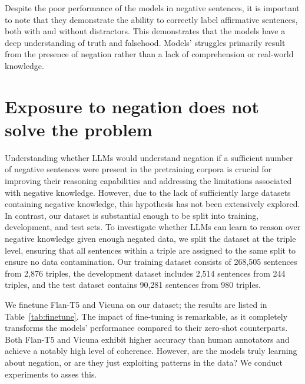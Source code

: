 \documentclass[11pt]{article}
\begin{document}
Despite the poor performance of the models in negative sentences, it is important to note that they demonstrate the ability to correctly label affirmative sentences, both with and without distractors. This demonstrates that the models have a deep understanding of truth and falsehood. Models' struggles primarily result from the presence of negation rather than a lack of comprehension or real-world knowledge.

\section{Exposure to negation does not solve the problem}
\label{sec:finetune}


Understanding whether LLMs would understand negation if a sufficient number of negative sentences were present in the pretraining corpora is crucial for improving their reasoning capabilities and addressing the limitations associated with negative knowledge. However, due to the lack of sufficiently large datasets containing negative knowledge, this hypothesis has not been extensively explored. In contrast, our dataset is substantial enough to be split into training, development, and test sets. 
To investigate whether LLMs can learn to reason over negative knowledge given enough negated data, we split the dataset at the triple level, ensuring that all sentences within a triple are assigned to the same split to ensure no data contamination. Our training dataset consists of 268,505 sentences from 2,876 triples, the development dataset includes 2,514 sentences from 244 triples, and the test dataset contains 90,281 sentences from 980 triples.



We finetune Flan-T5 and Vicuna on our dataset; the results are listed in Table~\ref{tab:finetune}. The impact of fine-tuning is remarkable, as it completely transforms the models' performance compared to their zero-shot counterparts. Both Flan-T5 and Vicuna exhibit higher accuracy than human annotators and  achieve a notably high level of coherence. 
However, are the models truly learning about negation, or are they just exploiting patterns in the data? We conduct experiments to asses this. 


\end{document}
